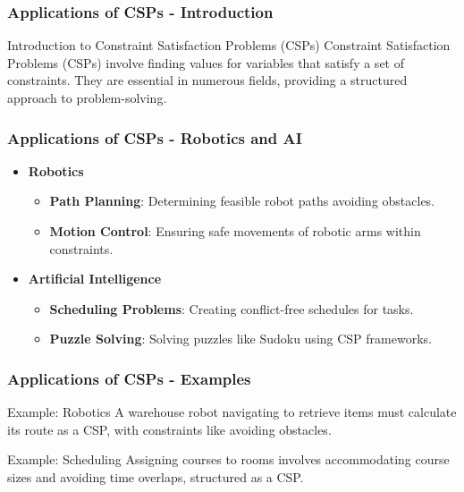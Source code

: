 \documentclass[aspectratio=169]{beamer}
\begin{document}
\begin{frame}[fragile]
    \frametitle{Applications of CSPs - Introduction}
    \begin{block}{Introduction to Constraint Satisfaction Problems (CSPs)}
        Constraint Satisfaction Problems (CSPs) involve finding values for variables that satisfy a set of constraints. They are essential in numerous fields, providing a structured approach to problem-solving.
    \end{block}
\end{frame}

\begin{frame}[fragile]
    \frametitle{Applications of CSPs - Robotics and AI}
    \begin{itemize}
        \item \textbf{Robotics}
        \begin{itemize}
            \item \textbf{Path Planning}: Determining feasible robot paths avoiding obstacles.
            \item \textbf{Motion Control}: Ensuring safe movements of robotic arms within constraints.
        \end{itemize}
        \item \textbf{Artificial Intelligence}
        \begin{itemize}
            \item \textbf{Scheduling Problems}: Creating conflict-free schedules for tasks.
            \item \textbf{Puzzle Solving}: Solving puzzles like Sudoku using CSP frameworks.
        \end{itemize}
    \end{itemize}
\end{frame}

\begin{frame}[fragile]
    \frametitle{Applications of CSPs - Examples}
    \begin{block}{Example: Robotics}
        A warehouse robot navigating to retrieve items must calculate its route as a CSP, with constraints like avoiding obstacles.
    \end{block}
    
    \begin{block}{Example: Scheduling}
        Assigning courses to rooms involves accommodating course sizes and avoiding time overlaps, structured as a CSP.
    \end{block}
\end{frame}
\end{document}

